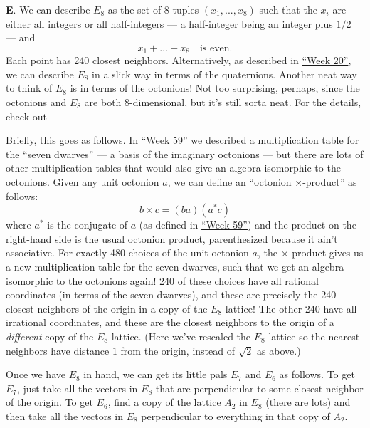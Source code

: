 \documentclass{article}
\def\tightlist{}
\renewcommand{\texttt}[1]{%
  \begingroup
  \ttfamily
  \begingroup\lccode`~=`/\lowercase{\endgroup\def~}{/\discretionary{}{}{}}%
  \begingroup\lccode`~=`[\lowercase{\endgroup\def~}{[\discretionary{}{}{}}%
  \begingroup\lccode`~=`.\lowercase{\endgroup\def~}{.\discretionary{}{}{}}%
  \catcode`/=\active\catcode`[=\active\catcode`.=\active
  \scantokens{#1\noexpand}%
  \endgroup
}
\begin{document}
\textbf{E}. We can describe \(E_8\) as the set of 8-tuples
\((x_1,...,x_8)\) such that the \(x_i\) are either all integers or all
half-integers --- a half-integer being an integer plus \(1/2\) --- and
\[x_1+\ldots+x_8\quad\text{is even}.\] Each point has 240 closest
neighbors. Alternatively, as described in
\protect\hyperlink{week20}{``Week 20''}, we can describe \(E_8\) in a
slick way in terms of the quaternions. Another neat way to think of
\(E_8\) is in terms of the octonions! Not too surprising, perhaps, since
the octonions and \(E_8\) are both 8-dimensional, but it's still sorta
neat. For the details, check out


Briefly, this goes as follows. In \protect\hyperlink{week59}{``Week
59''} we described a multiplication table for the ``seven dwarves'' ---
a basis of the imaginary octonions --- but there are lots of other
multiplication tables that would also give an algebra isomorphic to the
octonions. Given any unit octonion \(a\), we can define an ``octonion
\(\times\)-product'' as follows: \[b \times c = (b a)(a^* c)\] where
\(a^*\) is the conjugate of \(a\) (as defined in
\protect\hyperlink{week59}{``Week 59''}) and the product on the
right-hand side is the usual octonion product, parenthesized because it
ain't associative. For exactly 480 choices of the unit octonion \(a\),
the \(\times\)-product gives us a new multiplication table for the seven
dwarves, such that we get an algebra isomorphic to the octonions again!
240 of these choices have all rational coordinates (in terms of the
seven dwarves), and these are precisely the 240 closest neighbors of the
origin in a copy of the \(E_8\) lattice! The other 240 have all
irrational coordinates, and these are the closest neighbors to the
origin of a \emph{different} copy of the \(E_8\) lattice. (Here we've
rescaled the \(E_8\) lattice so the nearest neighbors have distance
\(1\) from the origin, instead of \(\sqrt{2}\) as above.)

Once we have \(E_8\) in hand, we can get its little pals \(E_7\) and
\(E_6\) as follows. To get \(E_7\), just take all the vectors in \(E_8\)
that are perpendicular to some closest neighbor of the origin. To get
\(E_6\), find a copy of the lattice \(A_2\) in \(E_8\) (there are lots)
and then take all the vectors in \(E_8\) perpendicular to everything in
that copy of \(A_2\).
\end{document}
